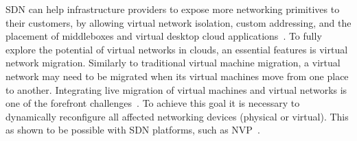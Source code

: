 %

%

SDN can help infrastructure providers to expose more networking primitives to their customers, by allowing virtual network isolation, custom addressing, and the placement of middleboxes and virtual desktop cloud applications~\cite{benson2011,calyam2013}. 
To fully explore the potential of virtual networks in clouds, an essential features is virtual network migration. 
Similarly to traditional virtual machine migration, a virtual network may need to be migrated when its virtual machines move from one place to another. Integrating live migration of virtual 
machines and virtual networks is one of the forefront challenges~\cite{keller2012}.
To achieve this goal it is necessary to dynamically reconfigure all affected networking devices (physical or 
virtual).
This as shown to be possible with SDN platforms, such as NVP~\cite{koponen}.


